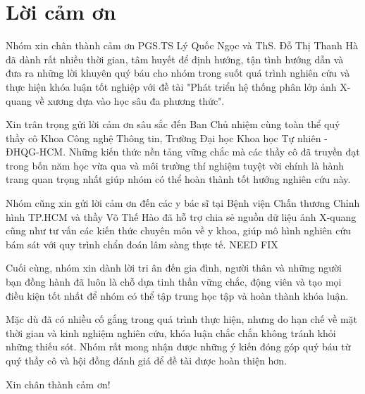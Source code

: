 \chapter*{Lời cảm ơn}
\label{thanks}

Nhóm xin chân thành cảm ơn PGS.TS Lý Quốc Ngọc và ThS. Đỗ Thị Thanh Hà đã dành rất nhiều thời gian, tâm huyết để định hướng, tận tình hướng dẫn và đưa ra những lời khuyên quý báu cho nhóm trong suốt quá trình nghiên cứu và thực hiện khóa luận tốt nghiệp với đề tài "Phát triển hệ thống phân lớp ảnh X-quang về xương dựa vào học sâu đa phương thức". 

Xin trân trọng gửi lời cảm ơn sâu sắc đến Ban Chủ nhiệm cùng toàn thể quý thầy cô Khoa Công nghệ Thông tin, Trường Đại học Khoa học Tự nhiên - ĐHQG-HCM. Những kiến thức nền tảng vững chắc mà các thầy cô đã truyền đạt trong bốn năm học vừa qua và môi trường thí nghiệm tuyệt vời chính là hành trang quan trọng nhất giúp nhóm có thể hoàn thành tốt hướng nghiên cứu này.

Nhóm cũng xin gửi lời cảm ơn đến các y bác sĩ tại Bệnh viện Chấn thương Chỉnh hình TP.HCM và thầy Võ Thế Hào đã hỗ trợ chia sẻ nguồn dữ liệu ảnh X-quang cũng như tư vấn các kiến thức chuyên môn về y khoa, giúp mô hình nghiên cứu bám sát với quy trình chẩn đoán lâm sàng thực tế. NEED FIX

Cuối cùng, nhóm xin dành lời tri ân đến gia đình, người thân và những người bạn đồng hành đã luôn là chỗ dựa tinh thần vững chắc, động viên và tạo mọi điều kiện tốt nhất để nhóm có thể tập trung học tập và hoàn thành khóa luận.

Mặc dù đã có nhiều cố gắng trong quá trình thực hiện, nhưng do hạn chế về mặt thời gian và kinh nghiệm nghiên cứu, khóa luận chắc chắn không tránh khỏi những thiếu sót. Nhóm rất mong nhận được những ý kiến đóng góp quý báu từ quý thầy cô và hội đồng đánh giá để đề tài được hoàn thiện hơn.

Xin chân thành cảm ơn!